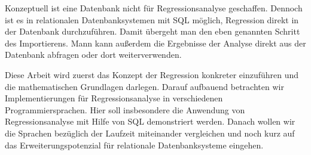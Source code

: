 Konzeptuell ist eine Datenbank nicht für Regressionsanalyse geschaffen. Dennoch ist es in relationalen Datenbanksystemen mit SQL möglich, Regression direkt in der Datenbank durchzuführen. Damit übergeht man den eben genannten Schritt des Importierens. Mann kann außerdem die Ergebnisse der Analyse direkt aus der Datenbank abfragen oder dort weiterverwenden.

Diese Arbeit wird zuerst das Konzept der Regression konkreter einzuführen und die mathematischen Grundlagen darlegen. Darauf aufbauend betrachten wir Implementierungen für Regressionsanalyse in verschiedenen Programmiersprachen. Hier soll insbesondere die Anwendung von Regressionsanalyse mit Hilfe von SQL demonstriert werden. Danach wollen wir die Sprachen bezüglich der Laufzeit miteinander vergleichen und noch kurz auf das Erweiterungspotenzial für relationale Datenbanksysteme eingehen.

